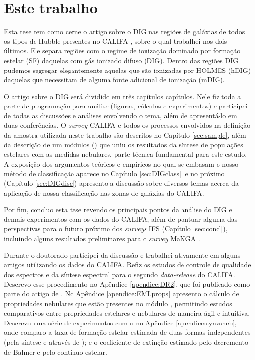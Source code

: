 \section{Este trabalho}
\label{sec:intro:estetrabalho}

Esta tese tem como cerne o artigo sobre o DIG nas regiões de galáxias de todos os tipos de Hubble presentes no CALIFA  \citep[][Apêndice \ref{apendice:DIGpaper0}]{Lacerda.etal.2018}, sobre o qual trabalhei nos dois últimos. Ele separa regiões com o regime de ionização dominado por formação estelar (SF) daquelas com gás ionizado difuso (DIG). Dentro das regiões DIG pudemos segregar elegantemente aquelas que são ionizadas por HOLMES (hDIG) daquelas que necessitam de alguma fonte adicional de ionização (mDIG).

O artigo sobre o DIG será dividido em três capítulos capítulos. Nele fiz toda a parte de programação para análise (figuras, cálculos e experimentos) e participei de todas as discussões e análises envolvendo o tema, além de apresentá-lo em duas conferências. O {\em survey} CALIFA e todos os processos envolvidos na definição da amostra utilizada neste trabalho são descritos no Capítulo \ref{sec:sample}, além da descrição de um módulos (\emldc) que uniu os resultados da síntese de populações estelares com as medidas nebulares, parte técnica fundamental para este estudo. A exposição dos argumentos teóricos e empíricos no qual se embasam o nosso método de classificação aparece no Capítulo \ref{sec:DIGclass}, e no próximo (Capítulo \ref{sec:DIGdisc}) apresento a discussão sobre diversos temas acerca da aplicação de nossa classificação nas zonas de galáxias do CALIFA.

Por fim, concluo esta tese revendo os principais pontos da análise do DIG e demais experimentos com os dados do CALIFA, além de pontuar alguma das perspectivas para o futuro próximo dos {\em surveys} IFS (Capítulo \ref{sec:concl}), incluindo alguns resultados preliminares para o {\em survey} MaNGA \citep{Bundy.etal.2015}.

Durante o doutorado participei da discussão e trabalhei ativamente em alguns artigos utilizando os dados do CALIFA. Refiz os estudos de controle de qualidade dos espectros e da síntese espectral para o segundo {\em data-release} do CALIFA. Descrevo esse procedimento no Apêndice \ref{apendice:DR2}, que foi publicado como parte do artigo de \citet[][Apêndice \ref{apendice:GBetal2015a}]{GarciaBenito.etal.2015a}. No Apêndice \ref{apendice:EMLprops} apresento o cálculo de propriedades nebulares que estão presentes no módulo \emldc, permitindo estudos comparativos entre propriedades estelares e nebulares de maneira ágil e intuitiva. Descrevo uma série de experimentos com o \emldc no Apêndice \ref{apendice:synvsneb}, onde comparo a taxa de formação estelar estimada de duas formas independentes (pela síntese e através de \Ha); e o coeficiente de extinção estimado pelo decremento de Balmer e pelo contínuo estelar.

